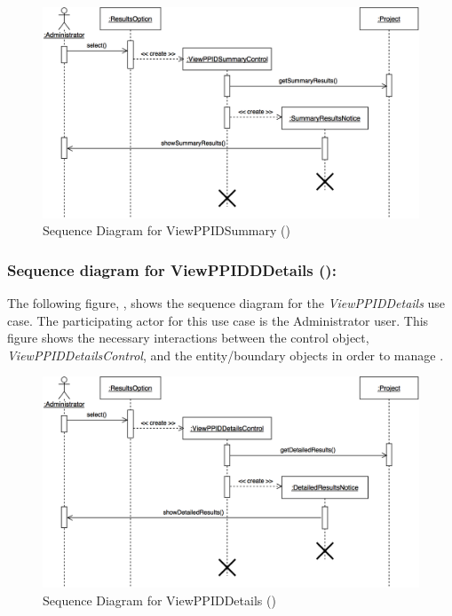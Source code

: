 \documentclass[12pt,letterpaper]{article}
\begin{document}
\begin{figure}[H]
	\centering{}
	\includegraphics[scale=0.25]{imgs/seq/view-ppid-summary.png}
	\caption[ - Sequence Diagram for ViewPPIDSummary]{Sequence Diagram for ViewPPIDSummary ()}
\end{figure}

\subsubsection*{Sequence diagram for ViewPPIDDDetails ():}

The following figure, , shows the sequence diagram for the {\it ViewPPIDDetails} use case. The participating actor for this use case is
the Administrator user. This figure shows the necessary interactions between the control object, {\it ViewPPIDDetailsControl}, and the
entity/boundary objects in order to manage .

\begin{figure}[H]
	\centering{}
	\includegraphics[scale=0.25]{imgs/seq/view-ppid-details.png}
	\caption[ - Sequence Diagram for ViewPPIDDetails]{Sequence Diagram for ViewPPIDDetails ()}
\end{figure}
\end{document}
